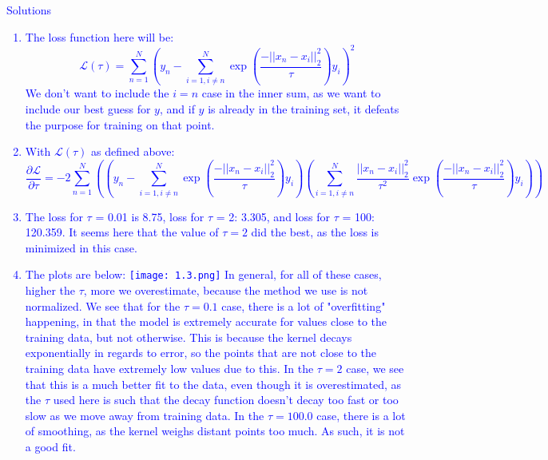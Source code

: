 \documentclass[submit]{harvardml}
\newcommand{\Lagr}{\mathcal{L}}
\begin{document}
\newpage
\textcolor{blue}{
\begin{framed}
Solutions
\begin{enumerate}
    \item The loss function here will be:
            \begin{equation*}
              \Lagr(\tau) = \sum_{n=1}^N (y_n - \sum_{i=1, i \neq n}^N \exp\left(\frac{-||x_n-x_i||^2_2}{\tau}\right) y_i)^2 
            \end{equation*}
        We don't want to include the $i=n$ case in the inner sum, as we want to include our best guess for $y$, and if $y$ is already in the training set, it defeats the purpose for training on that point.
    \item With $\Lagr(\tau)$ as defined above:
        \begin{equation*}
            \frac{\partial \Lagr}{\partial \tau} = 
            -2\sum_{n=1}^N ((y_n - \sum_{i=1, i \neq n}^N \exp\left(\frac{-||x_n-x_i||^2_2}{\tau}\right) y_i)
            (\sum_{i=1, i \neq n}^N \frac{||x_n-x_i||_2^2}{\tau^2}\exp\left(\frac{-||x_n-x_i||^2_2}{\tau}\right)y_i))
        \end{equation*}
    \item The loss for $\tau$ = 0.01 is 8.75, loss for $\tau$ = 2: 3.305, and loss for $\tau$ = 100: 120.359. It seems here that the value of $\tau = 2$ did the best, as the loss is minimized in this case.
    \item The plots are below: \newline
    \texttt{[image: 1.3.png]}
    \newline In general, for all of these cases, higher the $\tau$, more we overestimate, because the method we use is not normalized. \newline We see that for the $\tau = 0.1$ case, there is a lot of "overfitting" happening, in that the model is extremely accurate for values close to the training data, but not otherwise. This is because the kernel decays exponentially in regards to error, so the points that are not close to the training data have extremely low values due to this. \newline In the $\tau = 2$ case, we see that this is a much better fit to the data, even though it is overestimated, as the $\tau$ used here is such that the decay function doesn't decay too fast or too slow as we move away from training data. \newline In the $\tau = 100.0$ case, there is a lot of smoothing, as the kernel weighs distant points too much. As such, it is not a good fit.
\end{enumerate}
\end{framed}
}
\newpage
\end{document}
